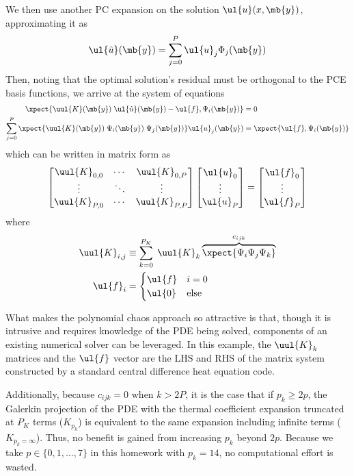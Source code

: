 \documentclass[11pt]{article}
\begin{document}
We then use another PC expansion on the solution $\ul{u}(x,\mb{y})$, approximating it as
\begin{equation}
\ul{\hat{u}}(\mb{y}) = \sum_{j=0}^P \ul{u}_j \Phi_j(\mb{y})
\end{equation}
Then, noting that the optimal solution's residual must be orthogonal to the PCE basis functions, we arrive at the system of equations
\begin{align}
\xpect{\uul{K}(\mb{y}) \; \ul{\hat{u}}(\mb{y}) - \ul{f}, \Psi_i(\mb{y})} &= 0
\\
\sum_{j=0}^P
\xpect{\uul{K}(\mb{y}) \; \Psi_i(\mb{y}) \; \Psi_j(\mb{y}) } \ul{u}_j(\mb{y}) &= \xpect{\ul{f}, \Psi_i(\mb{y})}
\end{align}
which can be written in matrix form as
\begin{equation}
\begin{bmatrix}
\uul{K}_{0,0} & \cdots & \uul{K}_{0,P} \\
\vdots & \ddots & \vdots \\
\uul{K}_{P,0} & \cdots & \uul{K}_{P,P}
\end{bmatrix}
\begin{bmatrix}
\ul{u}_0 \\ \vdots \\ \ul{u}_P
\end{bmatrix}
=
\begin{bmatrix}
\ul{f}_0 \\ \vdots \\ \ul{f}_P
\end{bmatrix}
\end{equation}
where
\begin{align}
\uul{K}_{i,j} &\equiv \sum_{k=0}^{P_K} \; \uul{K}_k \overbrace{\xpect{\Psi_i \Psi_j \Psi_k}}^{c_{ijk}}
\\
\ul{f}_i &=
\begin{cases}
\ul{f} & i=0 \\
\ul{0} & \text{else}
\end{cases}
\end{align}

What makes the polynomial chaos approach so attractive is that, though it is intrusive and requires knowledge of the PDE being solved, components of an existing numerical solver can be leveraged. In this example, the $\uul{K}_k$ matrices and the $\ul{f}$ vector are the LHS and RHS of the matrix system constructed by a standard central difference heat equation code.

Additionally, because $c_{ijk} = 0$ when $k > 2P$, it is the case that if $p_k \ge 2p$, the Galerkin projection of the PDE with the thermal coefficient expansion truncated at $P_K$ terms ($K_{p_k}$) is equivalent to the same expansion including infinite terms ($K_{p_k=\infty}$). Thus, no benefit is gained from increasing $p_k$ beyond $2p$. Because we take $p \in \{0, 1, \dots, 7\}$ in this homework with $p_k=14$, no computational effort is wasted.
\end{document}
